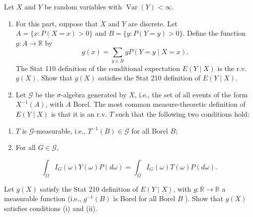 \documentclass[
  letterpaper,
  DIV=11,
  numbers=noendperiod]{scrreprt}
\theoremstyle{definition}
\theoremstyle{plain}
\theoremstyle{remark}
\begin{document}
Let \(X\) and \(Y\) be random variables with
\(\operatorname{Var}(Y)<\infty\).

\begin{enumerate}
\def\labelenumi{(\alph{enumi})}
\item
  For this part, suppose that \(X\) and \(Y\) are discrete. Let
  \(A=\{x: P(X=x)>0\}\) and \(B=\{y: P(Y=y)>0\}\). Define the function
  \(g: A \rightarrow \mathbb{R}\) by \[
  g(x)=\sum_{y \in B} y P(Y=y \mid X=x) .
  \] The Stat 110 definition of the conditional expectation
  \(E(Y \mid X)\) is the r.v. \(g(X)\). Show that \(g(X)\) satisfies the
  Stat 210 definition of \(E(Y \mid X)\).
\item
  Let \(\mathcal{G}\) be the \(\sigma\)-algebra generated by \(X\),
  i.e., the set of all events of the form \(X^{-1}(A)\), with \(A\)
  Borel. The most common measure-theoretic definition of \(E(Y \mid X)\)
  is that it is an r.v. \(T\) such that the following two conditions
  hold:
\end{enumerate}

\begin{enumerate}
\def\labelenumi{\roman{enumi}.}
\item
  \(T\) is \(\mathcal{G}\)-measurable, i.e.,
  \(T^{-1}(B) \in \mathcal{G}\) for all Borel \(B\);
\item
  For all \(G \in \mathcal{G}\),
\end{enumerate}

\[
\int_{\Omega} I_G(\omega) Y(\omega) P(d \omega)=\int_{\Omega} I_G(\omega) T(\omega) P(d \omega) .
\]

Let \(g(X)\) satisfy the Stat 210 definition of \(E(Y \mid X)\), with
\(g: \mathbb{R} \rightarrow \mathbb{R}\) a measurable function (i.e.,
\(g^{-1}(B)\) is Borel for all Borel \(B\) ). Show that \(g(X)\)
satisfies conditions (i) and (ii).
\end{document}
